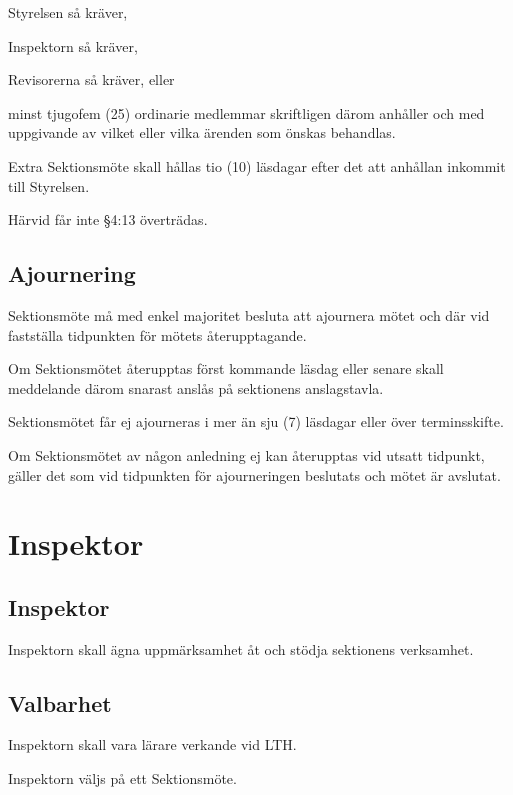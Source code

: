 \documentclass[10pt]{article}
\begin{document}
    \begin{alphlist}
    \item Styrelsen så kräver,
    \item Inspektorn så kräver,
    \item Revisorerna så kräver, eller
    \item minst tjugofem (25) ordinarie medlemmar skriftligen därom anhåller
        och med uppgivande av vilket eller vilka ärenden som önskas behandlas.
    \end{alphlist}
    
    Extra Sektionsmöte skall hållas tio (10) läsdagar efter det att anhållan
    inkommit till Styrelsen.
    
    Härvid får inte §4:13 överträdas.
    
    \subsection{Ajournering}
    Sektionsmöte må med enkel majoritet besluta att ajournera mötet och där vid
    fastställa tidpunkten för mötets återupptagande.
    
    Om Sektionsmötet återupptas först kommande läsdag eller senare skall
    meddelande därom snarast anslås på sektionens anslagstavla.
    
    Sektionsmötet får ej ajourneras i mer än sju (7) läsdagar eller över
    terminsskifte.
    
    Om Sektionsmötet av någon anledning ej kan återupptas vid utsatt tidpunkt,
    gäller det som vid tidpunkten för ajourneringen beslutats och mötet är
    avslutat.
    \newpage
    
    \section{Inspektor}
    \subsection{Inspektor}
    Inspektorn skall ägna uppmärksamhet åt och stödja sektionens verksamhet.
    
    \subsection{Valbarhet}
    Inspektorn skall vara lärare verkande vid LTH.
    
    Inspektorn väljs på ett Sektionsmöte.
    
\end{document}
